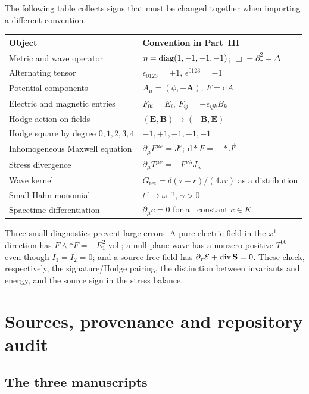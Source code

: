 \documentclass[11pt,letterpaper]{article}
\theoremstyle{definition}
\theoremstyle{remark}
\newcommand{\vol}{\operatorname{vol}}\newcommand{\GL}{\operatorname{GL}}
\newcommand{\dd}{\mathrm d}
\begin{document}
The following table collects signs that must be changed together when importing a different convention.
\begin{center}\small
\begin{tabularx}{\textwidth}{@{}p{}X@{}}
\toprule
Object & Convention in Part~III\\
\midrule
Metric and wave operator & $\eta=\operatorname{diag}(1,-1,-1,-1)$; $\Box=\partial_\tau^2-\Delta$\\
Alternating tensor & $\epsilon_{0123}=+1$, $\epsilon^{0123}=-1$\\
Potential components & $A_\mu=(\phi,-\mathbf A)$; $F=\dd A$\\
Electric and magnetic entries & $F_{0i}=E_i$, $F_{ij}=-\epsilon_{ijk}B_k$\\
Hodge action on fields & $(\mathbf E,\mathbf B)\mapsto(-\mathbf B,\mathbf E)$\\
Hodge square by degree $0,1,2,3,4$ & $-1,+1,-1,+1,-1$\\
Inhomogeneous Maxwell equation & $\partial_\mu F^{\mu\nu}=J^\nu$; $\dd* F=-* J^\flat$\\
Stress divergence & $\partial_\mu T^{\mu\nu}=-F^{\nu\lambda}J_\lambda$\\
Wave kernel & $G_{\mathrm{ret}}=\delta(\tau-r)/(4\pi r)$ as a distribution\\
Small Hahn monomial & $t^\gamma\mapsto\omega^{-\gamma}$, $\gamma>0$\\
Spacetime differentiation & $\partial_\mu c=0$ for all constant $c\in K$\\
\bottomrule
\end{tabularx}
\end{center}

Three small diagnostics prevent large errors. A pure electric field in the $x^1$ direction has $F\wedge* F=-E_1^2\vol$; a null plane wave has a nonzero positive $T^{00}$ even though $I_1=I_2=0$; and a source-free field has $\partial_\tau\mathcal E+\operatorname{div}\mathbf S=0$. These check, respectively, the signature/Hodge pairing, the distinction between invariants and energy, and the source sign in the stress balance.

\section{Sources, provenance and repository audit}\label{vtf:sec:audit}

\subsection{The three manuscripts}
\end{document}
